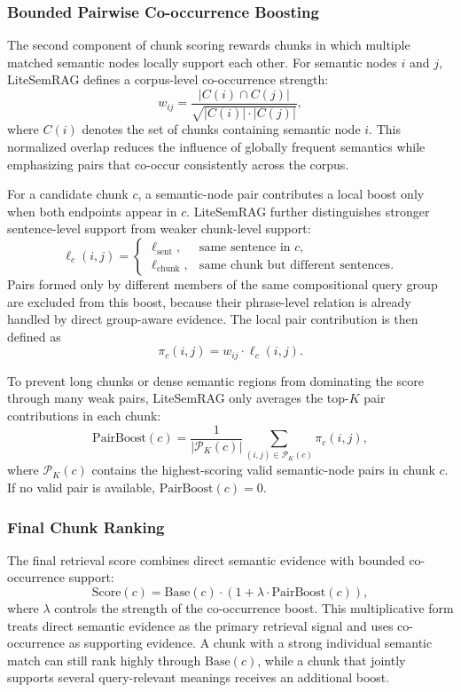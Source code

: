 \documentclass[conference]{IEEEtran}
\begin{document}
\subsubsection{Bounded Pairwise Co-occurrence Boosting}

The second component of chunk scoring rewards chunks in which multiple matched semantic nodes locally support each other. For semantic nodes $i$ and $j$, LiteSemRAG defines a corpus-level co-occurrence strength:
\[
w_{ij}
=
\frac{|C(i) \cap C(j)|}
{\sqrt{|C(i)| \cdot |C(j)|}},
\]
where $C(i)$ denotes the set of chunks containing semantic node $i$. This normalized overlap reduces the influence of globally frequent semantics while emphasizing pairs that co-occur consistently across the corpus.

For a candidate chunk $c$, a semantic-node pair contributes a local boost only when both endpoints appear in $c$. LiteSemRAG further distinguishes stronger sentence-level support from weaker chunk-level support:
\[ \ell_c(i,j) = \begin{cases} \ell_{\text{sent}}, & \text{same sentence in } c,\\ \ell_{\text{chunk}}, & \text{same chunk but different sentences}. \end{cases} \]
Pairs formed only by different members of the same compositional query group are excluded from this boost, because their phrase-level relation is already handled by direct group-aware evidence. The local pair contribution is then defined as
\[
\pi_c(i,j) = w_{ij} \cdot \ell_c(i,j).
\]

To prevent long chunks or dense semantic regions from dominating the score through many weak pairs, LiteSemRAG only averages the top-$K$ pair contributions in each chunk:
\[
\mathrm{PairBoost}(c)
=
\frac{1}{|\mathcal{P}_K(c)|}
\sum_{(i,j) \in \mathcal{P}_K(c)}
\pi_c(i,j),
\]
where $\mathcal{P}_K(c)$ contains the highest-scoring valid semantic-node pairs in chunk $c$. If no valid pair is available, $\mathrm{PairBoost}(c)=0$.

\subsubsection{Final Chunk Ranking}

The final retrieval score combines direct semantic evidence with bounded co-occurrence support:
\[
\mathrm{Score}(c)
=
\mathrm{Base}(c)
\cdot
\left(1+\lambda \cdot \mathrm{PairBoost}(c)\right),
\]
where $\lambda$ controls the strength of the co-occurrence boost. This multiplicative form treats direct semantic evidence as the primary retrieval signal and uses co-occurrence as supporting evidence. A chunk with a strong individual semantic match can still rank highly through $\mathrm{Base}(c)$, while a chunk that jointly supports several query-relevant meanings receives an additional boost.
\end{document}
